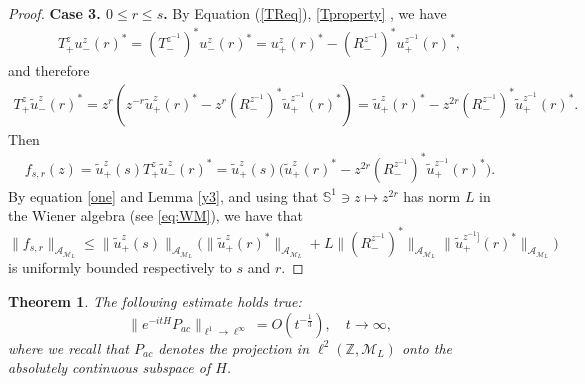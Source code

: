 \documentclass[12pt,oneside,onecolumn,open]{article}
\newtheorem{teo}{Theorem}[section]
\begin{document}
\begin{proof}
\textbf{Case 3. \( 0 \leq r \leq s \).} By Equation (\ref{TReq}), \eqref{Tproperty} , we have 
\begin{align}
    T_+^{z} u_-^{z}(r)^* = (T_-^{z^{-1}})^* u_-^{z}(r)^* = u_+^{z}(r)^* - (R_-^{z^{-1}})^* u_+^{z^{-1}}(r)^*,
\end{align}
and therefore
\begin{align}
    T_+^{z} \tilde{u}_-^{z}(r)^*  
     = z^{r} \left( z^{-r} \tilde{u}_+^{z}(r)^* - z^{r} (R_-^{z^{-1}})^* \tilde{u}_+^{z^{-1}}(r)^* \right) 
     = \tilde{u}_+^{z}(r)^* - z^{2r} (R_-^{z^{-1}})^* \tilde{u}_+^{z^{-1}}(r)^*.
\end{align}
  Then
  \begin{align}
      f_{s,r}(z)=\tilde{u}_{+}^{z}(s)T_{+}^{z}\tilde{u}_{-}^{z}(r)^{*}=\tilde{u}_{+}^{z}(s)\big(\tilde{u}_+^{z}(r)^* - z^{2r} (R_-^{z^{-1}})^* \tilde{u}_+^{z^{-1}}(r)^*\big).
  \end{align}
  By equation \eqref{one} and Lemma \ref{y3}, and using that $\mathbb{S}^{1}\ni z\mapsto z^{2r}$ has norm $L$ in the Wiener algebra (see \eqref{eq:WM}),  we have that  
  \begin{equation}
      \|f_{s,r}\|_{\mathcal{A}_{\mathcal{M}_L}}\leq \|\tilde{u}_{+}^{z}(s)\|_{\mathcal{A}_{\mathcal{M}_L}} \big(\|\tilde{u}_{+}^{z}(r)^{*}\|_{\mathcal{A}_{\mathcal{M}_L}}+ L \|(R_{-}^{z^{-1}})^{*}\|_{\mathcal{A}_{\mathcal{M}_L}} \|\tilde{u}_{+}^{z^{-1}]}(r)^{*}\|_{\mathcal{A}_{\mathcal{M}_L}}\big)
  \end{equation}
  is uniformly bounded respectively to $s$ and $r$.

  
\end{proof}

\begin{teo}\label{EST}
    The following estimate holds true: 
    $$ \|e^{-itH}P_{ac}\|_{\ell^{1} \to \ell^{\infty}} = O(t^{-\frac{1}{3}}), \quad t \to \infty , $$
    where we recall that \( P_{ac} \) denotes the projection in \( \ell^{2}(\mathbb{Z}, \mathcal{M}_{L}) \) onto the absolutely continuous subspace of \( H \).
\end{teo}
\end{document}
